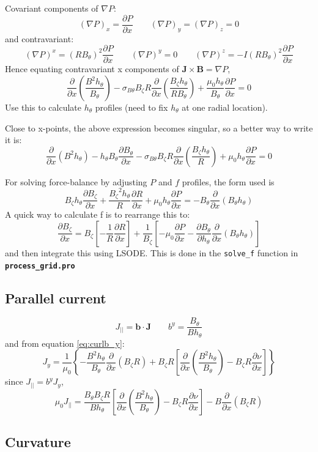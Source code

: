 \documentclass[12pt, a4paper]{article}
\newcommand{\code}[1]{\texttt{#1}}
\newcommand{\file}[1]{\texttt{\bf #1}}
\newcommand{\deriv}[2]{\ensuremath{\frac{\partial #1}{\partial #2}}}
\newcommand{\hthe}{\ensuremath{h_\theta}}
\newcommand{\Bp}{\ensuremath{B_\theta}}
\newcommand{\Bt}{\ensuremath{B_\zeta}}
\newcommand{\Vec}[1]{\ensuremath{\mathbf{#1}}}
\newcommand{\Bvec}{\Vec{B}}
\newcommand{\Jvec}{\Vec{J}}
\newcommand{\rbp}{\ensuremath{R\Bp}}
\newcommand{\rbpsq}{\ensuremath{\left(\rbp\right)^2}}
\newcommand{\sbp}{\ensuremath{\sigma_{B\theta}}}
\begin{document}
Covariant components of $\nabla P$:
\[
\left(\nabla P\right)_x = \deriv{P}{x} \qquad \left(\nabla P\right)_y = \left(\nabla P\right)_z = 0
\]
and contravariant:
\[
\left(\nabla P\right)^x = \rbpsq\deriv{P}{x} \qquad \left(\nabla P\right)^y = 0 \qquad \left(\nabla P\right)^z = -I\rbpsq\deriv{P}{x}
\]
Hence equating contravariant x components of $\Jvec\times\Bvec = \nabla P$,
\begin{equation}
\deriv{}{x}\left(\frac{B^2\hthe}{\Bp}\right) - \sbp\Bt R\deriv{}{x}\left(\frac{\Bt\hthe}{R\Bp}\right) + \frac{\mu_0\hthe}{\Bp}\deriv{P}{x} = 0
\label{eq:xbalance}
\end{equation}
Use this to calculate $\hthe$ profiles (need to fix $\hthe$ at one radial location).

Close to x-points, the above expression becomes singular, so a better way to write it is:
\[
\deriv{}{x}\left(B^2\hthe\right) - \hthe\Bp\deriv{\Bp}{x} - \sbp \Bt R\deriv{}{x}\left(\frac{\Bt\hthe}{R}\right) + \mu_0\hthe\deriv{P}{x} = 0
\]

For solving force-balance by adjusting $P$ and $f$ profiles, the form used is
\[
\Bt\hthe\deriv{\Bt}{x} + \frac{\Bt^2\hthe}{R}\deriv{R}{x} + \mu_0\hthe\deriv{P}{x} = -\Bp\deriv{}{x}\left(\Bp\hthe\right)
\]
A quick way to calculate f is to rearrange this to:
\[
\deriv{\Bt}{x} = \Bt\left[-\frac{1}{R}\deriv{R}{x}\right] + \frac{1}{\Bt}\left[-\mu_0\deriv{P}{x} - \deriv{\Bp}{\hthe}\deriv{}{x}\left(\Bp\hthe\right)\right]
\]
and then integrate this using LSODE. This is done in the \code{solve\_f} function in \file{process\_grid.pro}

\subsection{Parallel current}

\[
J_{||} = \mathbf{b}\cdot\Jvec \qquad b^y = \frac{\Bp}{B\hthe}
\]
and from equation \ref{eq:curlb_y}:
\[
J_y = \frac{1}{\mu_0}\left\{-\frac{B^2\hthe}{\Bp}\deriv{}{x}\left(\Bt R\right) + \Bt R\left[\deriv{}{x}\left(\frac{B^2\hthe}{\Bp}\right) - \Bt R\deriv{\nu}{x}\right]\right\}
\]
since $J_{||} = b^yJ_y$,
\[
\mu_0 J_{||} =\frac{\Bp\Bt R}{B\hthe}\left[\deriv{}{x}\left(\frac{B^2\hthe}{\Bp}\right) - \Bt R\deriv{\nu}{x}\right] - B\deriv{}{x}\left(\Bt R\right)
\]

\subsection{Curvature}
\end{document}
